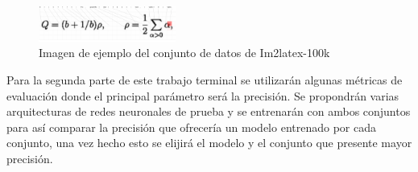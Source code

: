 \begin{figure}[h]
	\centering
	\includegraphics[width=0.4\textwidth]{capitulo5/dataset/Dengetal.png}
	\caption{Imagen de ejemplo del conjunto de datos de Im2latex-100k}
	\label{fig:deng}
\end{figure}

Para la segunda parte de este trabajo terminal se utilizarán algunas métricas de evaluación donde el principal parámetro será la precisión. Se propondrán varias arquitecturas de redes neuronales de prueba y se entrenarán con ambos conjuntos para así comparar la precisión que ofrecería un modelo entrenado por cada conjunto, una vez hecho esto se elijirá el modelo y el conjunto que presente mayor precisión.  